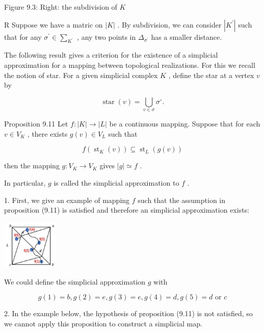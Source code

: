 Figure 9.3: Right: the subdivision of \(K\)

R Suppose we have a matric on \(\left| K\right|\) . By subdivision, we can consider \(\left| {K}^{\prime }\right|\) such that for any \({\sigma }^{\prime } \in  {\sum }_{{K}^{\prime }}\) , any two points in \({\Delta }_{{\sigma }^{\prime }}\) has a smaller distance.

The following result gives a criterion for the existence of a simplicial approximation for a mapping between topological realizations. For this we recall the notion of star. For a given simplicial complex \(K\) , define the star at a vertex \(v\) by

\[
\operatorname{star}\left( v\right)  = \mathop{\bigcup }\limits_{{v \in  \sigma }}{\sigma }^{ \circ  }.
\]

Proposition 9.11 Let \(f : \left| K\right|  \rightarrow  \left| L\right|\) be a continuous mapping. Suppose that for each \(v \in  {V}_{K}\) , there exists \(g\left( v\right)  \in  {V}_{L}\) such that

\[
f\left( {{\operatorname{st}}_{K}\left( v\right) }\right)  \subseteq  {\operatorname{st}}_{L}\left( {g\left( v\right) }\right)
\]

then the mapping \(g : {V}_{K} \rightarrow  {V}_{K}\) gives \(\left| g\right|  \simeq  f\) .

In particular, \(g\) is called the simplicial approximation to \(f\) .

1. First, we give an example of mapping \(f\) such that the assumption in proposition (9.11) is satisfied and therefore an simplicial approximation exists:

\begin{center}
\includegraphics[max width=0.2\textwidth]{images/bo_d2bcsrref24c73avs720_97_913_582_280_245_0.jpg}
\end{center}
\hspace*{3em} 

We could define the simplicial approximation \(g\) with

\[
g\left( 1\right)  = b,g\left( 2\right)  = e,g\left( 3\right)  = e,g\left( 4\right)  = d,g\left( 5\right)  = d\text{ or }c
\]

2. In the example below, the hypothesis of proposition (9.11) is not satisfied, so we cannot apply this proposition to construct a simplicial map.

